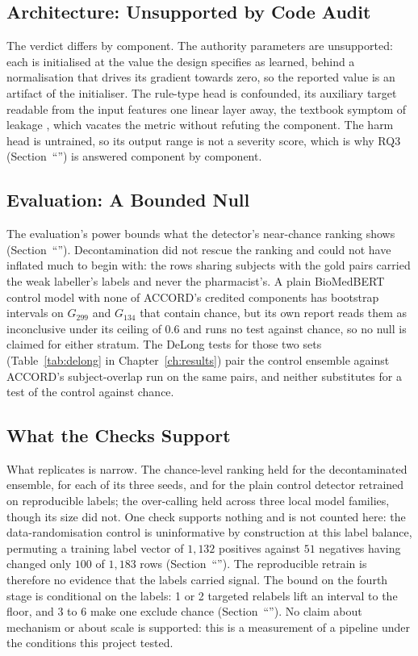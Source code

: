 \subsection{Architecture: Unsupported by Code Audit}

The verdict differs by component. The authority parameters are unsupported: each is initialised at the value the design
specifies as learned, behind a normalisation that drives its gradient towards zero, so the
reported value is an artifact of the initialiser. The rule-type head
is confounded, its auxiliary target readable from the input features one linear
layer away, the textbook symptom of leakage \citep{kaufman2012leakage}, which
vacates the metric without refuting the component. The harm head is untrained, so
its output range is not a severity score, which is why RQ3
(Section~``'') is answered component by component.

\subsection{Evaluation: A Bounded Null}

The evaluation's power bounds what the detector's near-chance ranking shows
(Section~``''). Decontamination did not rescue the ranking and could not have
inflated much to begin with: the rows sharing subjects with the gold pairs carried the weak
labeller's labels and never the pharmacist's. A plain BioMedBERT control model with none of
ACCORD's credited components has bootstrap intervals on $G_{299}$ and $G_{134}$ that contain
chance, but its own report reads them as inconclusive under its ceiling of $0.6$ and runs no test
against chance, so no null is claimed for either stratum. The DeLong tests for those two sets
(Table~\ref{tab:delong} in Chapter~\ref{ch:results}) pair the control ensemble against ACCORD's
subject-overlap run on the same pairs, and neither substitutes for a test of the control against
chance.

\subsection{What the Checks Support}

What replicates is narrow. The chance-level ranking held for the decontaminated
ensemble, for each of its three seeds, and for the plain control detector
retrained on reproducible labels; the over-calling held across three local model
families, though its size did not. One check supports nothing and is not counted here: the data-randomisation control is
uninformative by construction at this label balance, permuting a training label vector of
$1{,}132$ positives against $51$ negatives having changed only $100$ of $1{,}183$ rows
(Section~``''). The reproducible retrain is therefore no evidence that
the labels carried signal. The bound on the fourth stage is conditional on
the labels: 1 or 2 targeted relabels lift an interval to the floor, and 3 to 6 make
one exclude chance (Section~``''). No claim about
mechanism or about scale is supported: this is a measurement of a pipeline under
the conditions this project tested.

